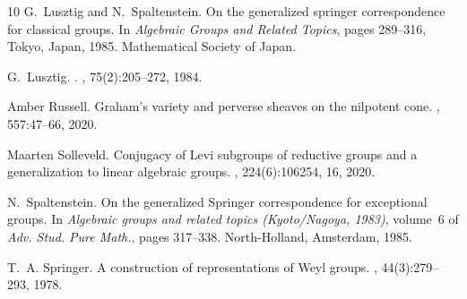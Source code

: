 \documentclass[reqno,11pt]{amsart}
\theoremstyle{remark}
\theoremstyle{remark}
\theoremstyle{definition}
\theoremstyle{definition}
\theoremstyle{definition}
\numberwithin{equation}{section}
\begin{document}
\begin{thebibliography}{10}
G.~Lusztig and N.~Spaltenstein.
\newblock On the generalized springer correspondence for classical groups.
\newblock In {\em Algebraic Groups and Related Topics}, pages 289--316, Tokyo,
  Japan, 1985. Mathematical Society of Japan.

G.~Lusztig.
.
, 75(2):205--272, 1984.

Amber Russell.
\newblock Graham's variety and perverse sheaves on the nilpotent cone.
, 557:47--66, 2020.

Maarten Solleveld.
\newblock Conjugacy of {L}evi subgroups of reductive groups and a
  generalization to linear algebraic groups.
, 224(6):106254, 16, 2020.

N.~Spaltenstein.
\newblock On the generalized {S}pringer correspondence for exceptional groups.
\newblock In {\em Algebraic groups and related topics ({K}yoto/{N}agoya,
  1983)}, volume~6 of {\em Adv. Stud. Pure Math.}, pages 317--338.
  North-Holland, Amsterdam, 1985.

T.~A. Springer.
\newblock A construction of representations of {W}eyl groups.
, 44(3):279--293, 1978.

\end{thebibliography}
\end{document}
